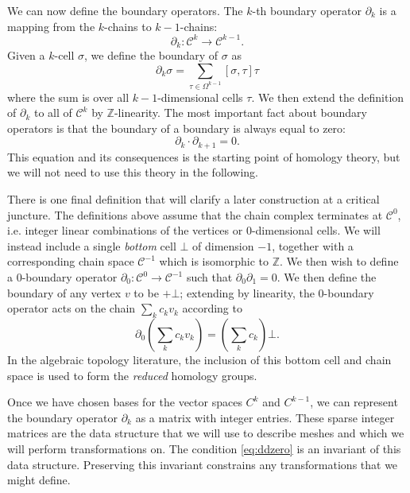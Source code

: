 \documentclass[twocolumn]{article}
\begin{document}
We can now define the boundary operators.
The $k$-th boundary operator $\partial_k$ is a mapping from the $k$-chains to $k - 1$-chains:
\begin{equation}
    \partial_k : \mathscr{C}^k \to \mathscr{C}^{k - 1}.
\end{equation}
Given a $k$-cell $\sigma$, we define the boundary of $\sigma$ as
\begin{equation}
    \partial_k\sigma = \sum_{\tau \in \Omega^{k - 1}}[\sigma, \tau]\tau
\end{equation}
where the sum is over all $k - 1$-dimensional cells $\tau$.
We then extend the definition of $\partial_k$ to all of $\mathscr C^k$ by $\mathbb{Z}$-linearity.
The most important fact about boundary operators is that the boundary of a boundary is always equal to zero:
\begin{equation}
    \partial_k\cdot\partial_{k + 1} = 0.
    \label{eq:ddzero}
\end{equation}
This equation and its consequences is the starting point of homology theory, but we will not need to use this theory in the following.

There is one final definition that will clarify a later construction at a critical juncture.
The definitions above assume that the chain complex terminates at $\mathscr{C}^0$, i.e. integer linear combinations of the vertices or 0-dimensional cells.
We will instead include a single \emph{bottom} cell $\bot$ of dimension $-1$, together with a corresponding chain space $\mathscr{C}^{-1}$ which is isomorphic to $\mathbb{Z}$.
We then wish to define a 0-boundary operator $\partial_0 : \mathscr{C}^0 \to \mathscr{C}^{-1}$ such that $\partial_0\partial_1 = 0$.
We then define the boundary of any vertex $v$ to be $+\bot$; extending by linearity, the 0-boundary operator acts on the chain $\sum_kc_kv_k$ according to
\begin{equation}
    \partial_0\left(\sum_kc_kv_k\right) = \left(\sum_kc_k\right)\bot.
\end{equation}
In the algebraic topology literature, the inclusion of this bottom cell and chain space is used to form the \emph{reduced} homology groups.

Once we have chosen bases for the vector spaces $C^k$ and $C^{k - 1}$, we can represent the boundary operator $\partial_k$ as a matrix with integer entries.
These sparse integer matrices are the data structure that we will use to describe meshes and which we will perform transformations on.
The condition \eqref{eq:ddzero} is an invariant of this data structure.
Preserving this invariant constrains any transformations that we might define.
\end{document}
